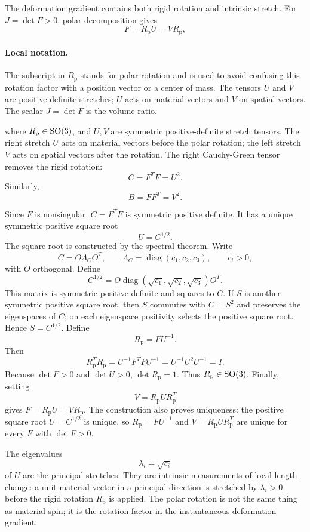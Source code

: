 The deformation gradient contains both rigid rotation and intrinsic stretch.
For \(J=\det F>0\), polar decomposition gives
\[
  \boxed{
  F=R_{\mathrm p}U=VR_{\mathrm p},
  }
\]

\paragraph{Local notation.}
The subscript in \(R_{\mathrm p}\) stands for polar rotation and is used to
avoid confusing this rotation factor with a position vector or a center of
mass.  The tensors \(U\) and \(V\) are positive-definite stretches; \(U\) acts
on material vectors and \(V\) on spatial vectors.  The scalar \(J=\det F\) is
the volume ratio.

where \(R_{\mathrm p}\in\operatorname{SO}(3)\), and \(U,V\) are symmetric positive-definite
stretch tensors. The right stretch \(U\) acts on material vectors before the
polar rotation; the left stretch \(V\) acts on spatial vectors after the
rotation. The right Cauchy-Green tensor removes the rigid rotation:
\[
  C=F^TF=U^2.
\]
Similarly,
\[
  B=FF^T=V^2.
\]

\begin{derivation}
Since \(F\) is nonsingular, \(C=F^TF\) is symmetric positive definite. It has a
unique symmetric positive square root
\[
  U=C^{1/2}.
\]
The square root is constructed by the spectral theorem. Write
\[
  C=O\Lambda_C O^T,\qquad
  \Lambda_C=\operatorname{diag}(c_1,c_2,c_3),
  \qquad c_i>0,
\]
with \(O\) orthogonal. Define
\[
  C^{1/2}=O\operatorname{diag}(\sqrt{c_1},\sqrt{c_2},\sqrt{c_3})O^T.
\]
This matrix is symmetric positive definite and squares to \(C\). If \(S\) is
another symmetric positive square root, then \(S\) commutes with \(C=S^2\) and
preserves the eigenspaces of \(C\); on each eigenspace positivity selects the
positive square root. Hence \(S=C^{1/2}\).
Define
\[
  R_{\mathrm p}=FU^{-1}.
\]
Then
\[
  R_{\mathrm p}^TR_{\mathrm p}
  =
  U^{-1}F^TFU^{-1}
  =
  U^{-1}U^2U^{-1}
  =
  I.
\]
Because \(\det F>0\) and \(\det U>0\), \(\det R_{\mathrm p}=1\). Thus
\(R_{\mathrm p}\in\operatorname{SO}(3)\). Finally, setting
\[
  V=R_{\mathrm p}UR_{\mathrm p}^T
\]
gives \(F=R_{\mathrm p}U=VR_{\mathrm p}\).
The construction also proves uniqueness: the positive square root \(U=C^{1/2}\)
is unique, so \(R_{\mathrm p}=FU^{-1}\) and \(V=R_{\mathrm p}UR_{\mathrm p}^T\)
are unique for every \(F\) with \(\det F>0\).
\end{derivation}

The eigenvalues
\[
  \lambda_i=\sqrt{c_i}
\]
of \(U\) are the principal stretches. They are intrinsic measurements of local
length change: a unit material vector in a principal direction is stretched by
\(\lambda_i>0\) before the rigid rotation \(R_{\mathrm p}\) is applied. The
polar rotation is not the same thing as material spin; it is the rotation factor
in the instantaneous deformation gradient.

